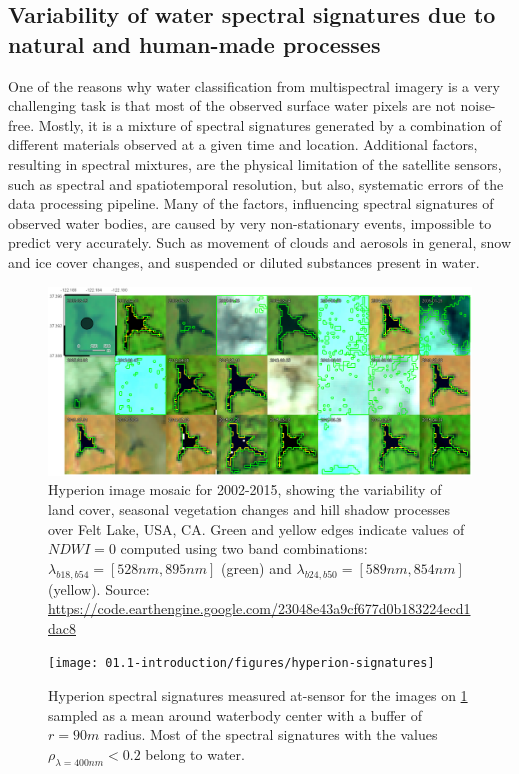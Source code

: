 \subsection{Variability of water spectral signatures due to natural and human-made processes}

One of the reasons why water classification from multispectral imagery is a very challenging task is that most of the observed surface water pixels are not noise-free. Mostly, it is a mixture of spectral signatures generated by a combination of different materials observed at a given time and location. Additional factors, resulting in spectral mixtures, are the physical limitation of the satellite sensors, such as spectral and spatiotemporal resolution, but also, systematic errors of the data processing pipeline. Many of the factors, influencing spectral signatures of observed water bodies, are caused by very non-stationary events, impossible to predict very accurately. Such as movement of clouds and aerosols in general, snow and ice cover changes, and suspended or diluted substances present in water. 

\begin{figure}
	\includegraphics[width=1.0\textwidth,left]{01.1-introduction/figures/hyperion-map}
	\caption{Hyperion image mosaic for 2002-2015, showing the variability of land cover, seasonal vegetation changes and hill shadow processes over Felt Lake, USA, CA. Green and yellow edges indicate values of $NDWI=0$ computed using two band combinations: $\lambda_{b18, b54} = [528nm, 895nm]$ (green) and $\lambda_{b24, b50} = [589nm, 854nm]$ (yellow).
	Source: \url{https://code.earthengine.google.com/23048e43a9cf677d0b183224ecd1dac8}} 
	\label{fig:intro-hyperion-example}
	
\end{figure}

\begin{figure}
	\texttt{[image: 01.1-introduction/figures/hyperion-signatures]}
	\caption{Hyperion spectral signatures measured at-sensor for the images on \ref{fig:intro-hyperion-example} sampled as a mean around waterbody center with a buffer of $r=90m$ radius. Most of the spectral signatures with the values $\rho_{\lambda = 400nm} < 0.2$ belong to water.} 
	\label{fig:intro-hyperion-example-signatures}
\end{figure}

